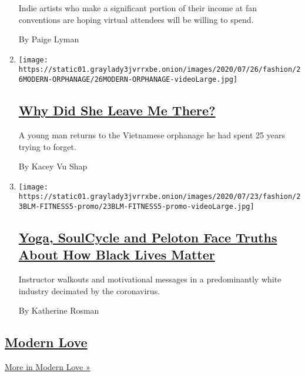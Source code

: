 \begin{enumerate}
  Indie artists who make a significant portion of their income at fan
  conventions are hoping virtual attendees will be willing to spend.

  By Paige Lyman
\item
  \texttt{[image: https://static01.graylady3jvrrxbe.onion/images/2020/07/26/fashion/26MODERN-ORPHANAGE/26MODERN-ORPHANAGE-videoLarge.jpg]}

  \hypertarget{why-did-she-leave-me-there}{%
  \subsection{\texorpdfstring{\href{/2020/07/24/style/modern-love-adoption-vietnam-why-did-she-leave-me-there.html}{Why
  Did She Leave Me
  There?}}{Why Did She Leave Me There?}}\label{why-did-she-leave-me-there}}

  A young man returns to the Vietnamese orphanage he had spent 25 years
  trying to forget.

  By Kacey Vu Shap
\item
  \texttt{[image: https://static01.graylady3jvrrxbe.onion/images/2020/07/23/fashion/23BLM-FITNESS5-promo/23BLM-FITNESS5-promo-videoLarge.jpg]}

  \hypertarget{yoga-soulcycle-and-peloton-face-truths-about-how-black-lives-matter}{%
  \subsection{\texorpdfstring{\href{/2020/07/23/style/peloton-black-lives-matter-ride-soul-cycle-y7.html}{Yoga,
  SoulCycle and Peloton Face Truths About How Black Lives
  Matter}}{Yoga, SoulCycle and Peloton Face Truths About How Black Lives Matter}}\label{yoga-soulcycle-and-peloton-face-truths-about-how-black-lives-matter}}

  Instructor walkouts and motivational messages in a predominantly white
  industry decimated by the coronavirus.

  By Katherine Rosman
\end{enumerate}

\hypertarget{modern-love}{%
\subsection{\texorpdfstring{\href{/column/modern-love}{Modern
Love}}{Modern Love}}\label{modern-love}}

\href{/column/modern-love}{More in Modern Love »}

